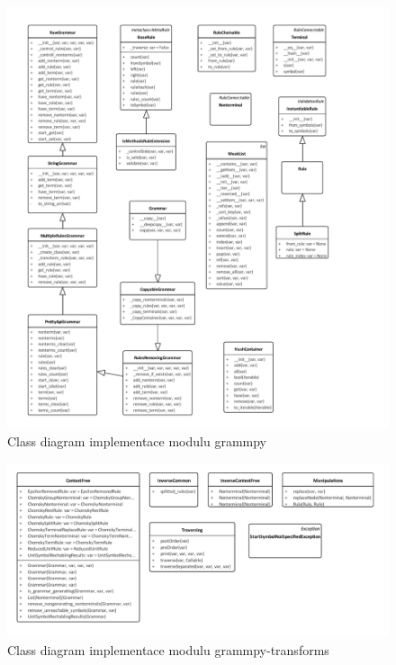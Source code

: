 	\begin{figure}				
		\centering
		\includegraphics[width=\linewidth]{img/grammpyAPI}
		\caption{Class diagram implementace modulu grammpy}
		\label{fig:grammpyClasses}
	\end{figure}

	\begin{figure}				
		\centering
		\includegraphics[width=\linewidth]{img/grammpy-transformsAPI}
		\caption{Class diagram implementace modulu grammpy-transforms}
		\label{fig:grammpyTransformsClasses}
	\end{figure}

